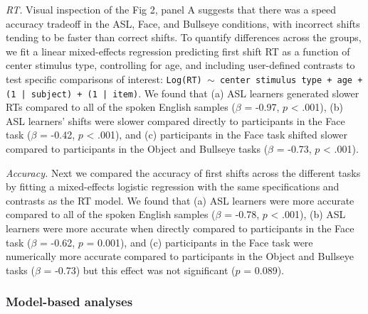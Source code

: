\documentclass[english,man]{apa6}
\theoremstyle{definition}
\theoremstyle{definition}
\theoremstyle{definition}
\theoremstyle{remark}
\begin{document}
\emph{RT.} Visual inspection of the Fig 2, panel A suggests that there
was a speed accuracy tradeoff in the ASL, Face, and Bullseye conditions,
with incorrect shifts tending to be faster than correct shifts. To
quantify differences across the groups, we fit a linear mixed-effects
regression predicting first shift RT as a function of center stimulus
type, controlling for age, and including user-defined contrasts to test
specific comparisons of interest:
\texttt{Log(RT) $\sim$ center stimulus type + age +  (1 | subject) + (1 | item)}.
We found that (a) ASL learners generated slower RTs compared to all of
the spoken English samples (\(\beta\) = -0.97, \(p\) \textless{} .001),
(b) ASL learners' shifts were slower compared directly to participants
in the Face task (\(\beta\) = -0.42, \(p\) \textless{} .001), and (c)
participants in the Face task shifted slower compared to participants in
the Object and Bullseye tasks (\(\beta\) = -0.73, \(p\) \textless{}
.001).

\emph{Accuracy.} Next we compared the accuracy of first shifts across
the different tasks by fitting a mixed-effects logistic regression with
the same specifications and contrasts as the RT model. We found that (a)
ASL learners were more accurate compared to all of the spoken English
samples (\(\beta\) = -0.78, \(p\) \textless{} .001), (b) ASL learners
were more accurate when directly compared to participants in the Face
task (\(\beta\) = -0.62, \(p\) = 0.001), and (c) participants in the
Face task were numerically more accurate compared to participants in the
Object and Bullseye tasks (\(\beta\) = -0.73) but this effect was not
significant (\(p\) = 0.089).

\hypertarget{model-based-analyses}{%
\subsubsection{Model-based analyses}\label{model-based-analyses}}
\end{document}

